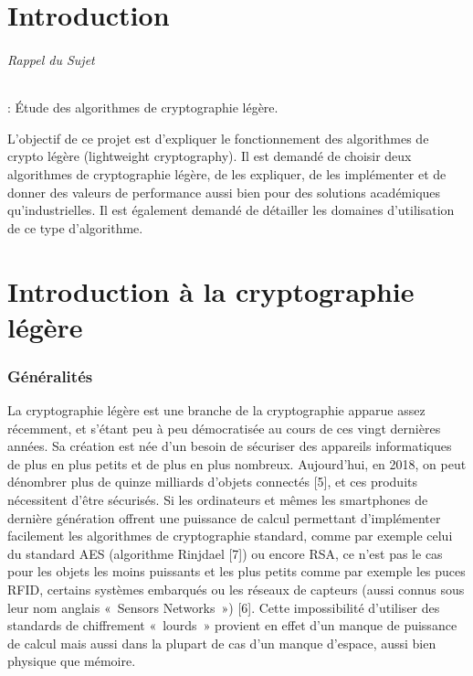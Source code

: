 \clearpage
\part*{Introduction}

	\paragraph{Rappel du Sujet} : Étude des algorithmes de cryptographie légère.

		L'objectif de ce projet est d'expliquer le fonctionnement des algorithmes de crypto légère
	(lightweight cryptography). Il est demandé de choisir deux algorithmes de
	cryptographie légère, de les expliquer, de les implémenter et de donner des
	valeurs de performance aussi bien pour des solutions académiques
	qu'industrielles. Il est également demandé de détailler les domaines
	d'utilisation de ce type d'algorithme.

	\clearpage


	\newpage

\newpage
\part{Introduction à la cryptographie légère}


	\section{Généralités}

			La cryptographie légère est une branche de la cryptographie apparue assez
		récemment,  et s’étant peu à peu démocratisée au cours de ces vingt
		dernières années. Sa création est née d’un besoin de sécuriser des appareils
		informatiques de plus en plus petits et de plus en plus nombreux.
		Aujourd’hui, en 2018, on peut dénombrer  plus de  quinze milliards d’objets
		connectés [5], et ces produits nécessitent d’être sécurisés. Si les
		ordinateurs et mêmes les smartphones de dernière génération offrent une
		puissance de calcul permettant d’implémenter facilement les algorithmes de
		cryptographie standard, comme par exemple celui du standard AES (algorithme
		Rinjdael [7]) ou encore RSA, ce n’est pas le cas pour les objets les moins
		puissants et les plus petits comme par exemple les puces RFID, certains
		systèmes embarqués ou les réseaux de capteurs (aussi connus sous leur nom
		anglais « Sensors Networks ») [6]. Cette impossibilité d’utiliser des
		standards de chiffrement « lourds » provient en effet d’un manque de
		puissance de calcul mais aussi dans la plupart de cas d’un manque d’espace,
		aussi bien physique que mémoire.

